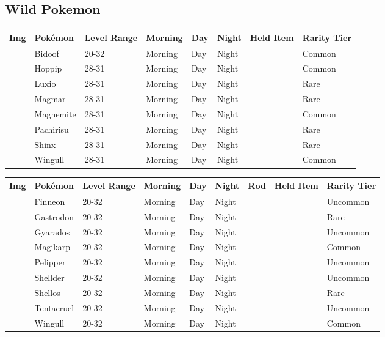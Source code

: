 \subsection{Wild Pokemon}%
\label{subsec:WildPokemon}%
\begin{longtable}{||l l l l l l l l||}%
\hline%
Img&Pokémon&Level Range&Morning&Day&Night&Held Item&Rarity Tier\\%
\hline%
\endhead%
\hline%
&Bidoof&20{-}32&Morning&Day&Night&&Common\\%
\hline%
&Hoppip&28{-}31&Morning&Day&Night&&Common\\%
\hline%
&Luxio&28{-}31&Morning&Day&Night&&Rare\\%
\hline%
&Magmar&28{-}31&Morning&Day&Night&&Rare\\%
\hline%
&Magnemite&28{-}31&Morning&Day&Night&&Common\\%
\hline%
&Pachirisu&28{-}31&Morning&Day&Night&&Rare\\%
\hline%
&Shinx&28{-}31&Morning&Day&Night&&Rare\\%
\hline%
&Wingull&28{-}31&Morning&Day&Night&&Common\\%
\hline%
\end{longtable}%
\begin{longtable}{||l l l l l l l l l||}%
\hline%
Img&Pokémon&Level Range&Morning&Day&Night&Rod&Held Item&Rarity Tier\\%
\hline%
\endhead%
\hline%
&Finneon&20{-}32&Morning&Day&Night&&&Uncommon\\%
\hline%
&Gastrodon&20{-}32&Morning&Day&Night&&&Rare\\%
\hline%
&Gyarados&20{-}32&Morning&Day&Night&&&Uncommon\\%
\hline%
&Magikarp&20{-}32&Morning&Day&Night&&&Common\\%
\hline%
&Pelipper&20{-}32&Morning&Day&Night&&&Uncommon\\%
\hline%
&Shellder&20{-}32&Morning&Day&Night&&&Uncommon\\%
\hline%
&Shellos&20{-}32&Morning&Day&Night&&&Rare\\%
\hline%
&Tentacruel&20{-}32&Morning&Day&Night&&&Uncommon\\%
\hline%
&Wingull&20{-}32&Morning&Day&Night&&&Common\\%
\hline%
\end{longtable}